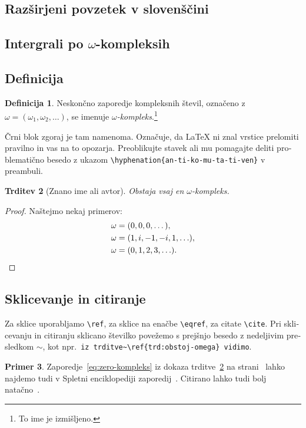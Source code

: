 \documentclass[12pt,a4paper,twoside]{article}
\theoremstyle{definition} %
\newtheorem{definicija}{Definicija}[section]
\newtheorem{primer}[definicija]{Primer}
\theoremstyle{plain} %
\newtheorem{trditev}[definicija]{Trditev}
\numberwithin{equation}{section}  %
\begin{document}
\cleardoublepage
\begin{otherlanguage}{slovene}
\section{Razširjeni povzetek v slovenščini}

\subsection{Intergrali po \texorpdfstring{$\omega$}{ω}-kompleksih}
\subsection{Definicija}
\begin{definicija}
  Neskončno zaporedje kompleksnih števil, označeno z $\omega = (\omega_1, \omega_2, \ldots)$,
  se imenuje \emph{$\omega$-kompleks}.\footnote{To ime je izmišljeno.}

  Črni blok zgoraj je tam namenoma. Označuje, da \LaTeX{} ni znal vrstice prelomiti pravilno
  in vas na to opozarja. Preoblikujte stavek ali mu pomagajte deliti problematično besedo z
  ukazom \verb|\hyphenation{an-ti-ko-mu-ta-ti-ven}| v preambuli.
\end{definicija}
\begin{trditev}[Znano ime ali avtor]
  \label{trd:obstoj-omega}
  Obstaja vsaj en $\omega$-kompleks.
\end{trditev}
\begin{proof}
  Naštejmo nekaj primerov:
  \begin{align}
    \omega &= (0, 0, 0, \dots), \label{eq:zero-kompleks} \\
    \omega &= (1, i, -1, -i, 1, \ldots),  \\
    \omega &= (0, 1, 2, 3, \ldots). \qedhere  %
  \end{align}
\end{proof}
\subsection{Sklicevanje in citiranje}
Za sklice uporabljamo \verb|\ref|, za sklice na enačbe \verb|\eqref|, za citate \verb|\cite|. Pri
sklicevanju in citiranju sklicano številko povežemo s prejšnjo besedo z nedeljivim presledkom
$\sim$, kot npr.\ \verb|iz trditve~\ref{trd:obstoj-omega} vidimo|.

\begin{primer}
  Zaporedje~\eqref{eq:zero-kompleks} iz dokaza trditve~\ref{trd:obstoj-omega} na
  strani~\pageref{trd:obstoj-omega} lahko najdemo tudi v Spletni enciklopediji zaporedij~\cite{oeis}.
  Citirano lahko tudi bolj natačno~\cite[trditev 2.1, str.\ 23]{lebedev2009introduction}.
\end{primer}


\end{otherlanguage}
\end{document}
